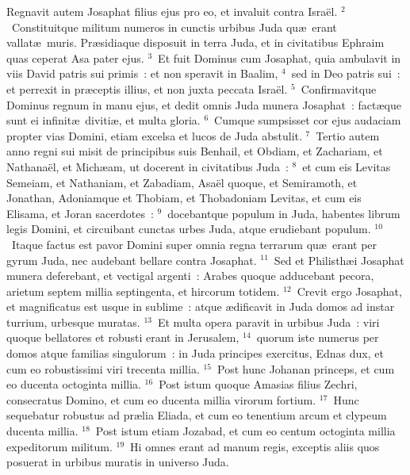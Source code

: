 \lettrine[lines=10,image=true,loversize=0.05,lraise=-0.03]{R}{}egnavit autem Josaphat filius ejus pro eo, et invaluit contra Isra\"el.
${}^{2}$~Constituitque militum numeros in cunctis urbibus Juda qu\ae\ erant vallat\ae\ muris. Pr\ae sidiaque disposuit in terra Juda, et in civitatibus Ephraim quas ceperat Asa pater ejus.
${}^{3}$~Et fuit Dominus cum Josaphat, quia ambulavit in viis David patris sui primis~: et non speravit in Baalim,
${}^{4}$~sed in Deo patris sui~: et perrexit in pr\ae ceptis illius, et non juxta peccata Isra\"el.
${}^{5}$~Confirmavitque Dominus regnum in manu ejus, et dedit omnis Juda munera Josaphat~: fact\ae que sunt ei infinit\ae\ diviti\ae , et multa gloria.
${}^{6}$~Cumque sumpsisset cor ejus audaciam propter vias Domini, etiam excelsa et lucos de Juda abstulit.
${}^{7}$~Tertio autem anno regni sui misit de principibus suis Benhail, et Obdiam, et Zachariam, et Nathana\"el, et Mich\ae am, ut docerent in civitatibus Juda~:
${}^{8}$~et cum eis Levitas Semeiam, et Nathaniam, et Zabadiam, Asa\"el quoque, et Semiramoth, et Jonathan, Adoniamque et Thobiam, et Thobadoniam Levitas, et cum eis Elisama, et Joran sacerdotes~:
${}^{9}$~docebantque populum in Juda, habentes librum legis Domini, et circuibant cunctas urbes Juda, atque erudiebant populum.
${}^{10}$~Itaque factus est pavor Domini super omnia regna terrarum qu\ae\ erant per gyrum Juda, nec audebant bellare contra Josaphat.
${}^{11}$~Sed et Philisth\ae i Josaphat munera deferebant, et vectigal argenti~: Arabes quoque adducebant pecora, arietum septem millia septingenta, et hircorum totidem.
${}^{12}$~Crevit ergo Josaphat, et magnificatus est usque in sublime~: atque \ae dificavit in Juda domos ad instar turrium, urbesque muratas.
${}^{13}$~Et multa opera paravit in urbibus Juda~: viri quoque bellatores et robusti erant in Jerusalem,
${}^{14}$~quorum iste numerus per domos atque familias singulorum~: in Juda principes exercitus, Ednas dux, et cum eo robustissimi viri trecenta millia.
${}^{15}$~Post hunc Johanan princeps, et cum eo ducenta octoginta millia.
${}^{16}$~Post istum quoque Amasias filius Zechri, consecratus Domino, et cum eo ducenta millia virorum fortium.
${}^{17}$~Hunc sequebatur robustus ad pr\ae lia Eliada, et cum eo tenentium arcum et clypeum ducenta millia.
${}^{18}$~Post istum etiam Jozabad, et cum eo centum octoginta millia expeditorum militum.
${}^{19}$~Hi omnes erant ad manum regis, exceptis aliis quos posuerat in urbibus muratis in universo Juda.

